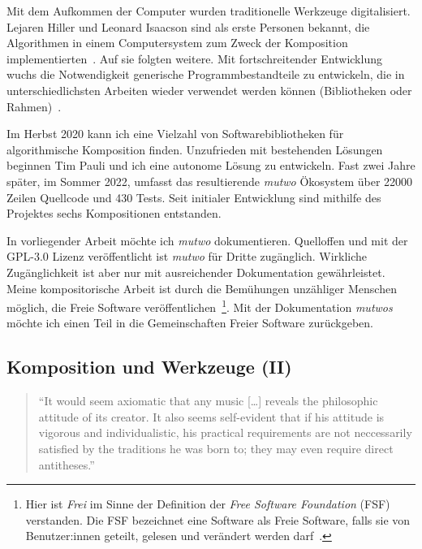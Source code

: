 \documentclass[12pt,a4paper,ngerman]{article}
\begin{document}
\bigskip

\noindent
Mit dem Aufkommen der Computer wurden traditionelle Werkzeuge digitalisiert.
Lejaren Hiller und Leonard Isaacson sind als erste Personen bekannt, die Algorithmen in einem Computersystem zum Zweck der Komposition implementierten~\parencite[S. 63]{algorithmicCompositionParadigms}.
Auf sie folgten weitere.
Mit fortschreitender Entwicklung wuchs die Notwendigkeit generische Programmbestandteile zu entwickeln, die in unterschiedlichsten Arbeiten wieder verwendet werden können (Bibliotheken oder Rahmen)~\parencite[S. 78]{paradigmsAndComputerMusic}.

\bigskip

\noindent
Im Herbst 2020 kann ich eine Vielzahl von Softwarebibliotheken für algorithmische Komposition finden.
Unzufrieden mit bestehenden Lösungen beginnen Tim Pauli und ich eine autonome Lösung zu entwickeln.
Fast zwei Jahre später, im Sommer 2022, umfasst das resultierende \emph{mutwo} Ökosystem über 22000 Zeilen Quellcode und 430 Tests.
Seit initialer Entwicklung sind mithilfe des Projektes sechs Kompositionen entstanden.

\bigskip

\noindent
In vorliegender Arbeit möchte ich \emph{mutwo} dokumentieren.
Quelloffen und mit der GPL-3.0 Lizenz veröffentlicht ist \emph{mutwo} für Dritte zugänglich.
Wirkliche Zugänglichkeit ist aber nur mit ausreichender Dokumentation gewährleistet.
Meine kompositorische Arbeit ist durch die Bemühungen unzähliger Menschen möglich, die Freie Software veröffentlichen~\footnote{Hier ist \emph{Frei} im Sinne der Definition der \emph{Free Software Foundation} (FSF) verstanden. Die FSF bezeichnet eine Software als Freie Software, falls sie von Benutzer:innen geteilt, gelesen und verändert werden darf~\parencite{freeSoftwareDefinition}.}.
Mit der Dokumentation \emph{mutwos} möchte ich einen Teil in die Gemeinschaften Freier Software zurückgeben.

\subsection{Komposition und Werkzeuge (II)}
\label{compositionAndTools2}

\begin{quote}
    ``It would seem axiomatic that any music [\dots] reveals the philosophic attitude of its creator.
    It also seems self-evident that if his attitude is vigorous and individualistic, his practical requirements are not neccessarily satisfied by the traditions he was born to;
    they may even require direct antitheses.''~\parencite[S. 3]{genesisOfMusic}
\end{quote}
\end{document}
